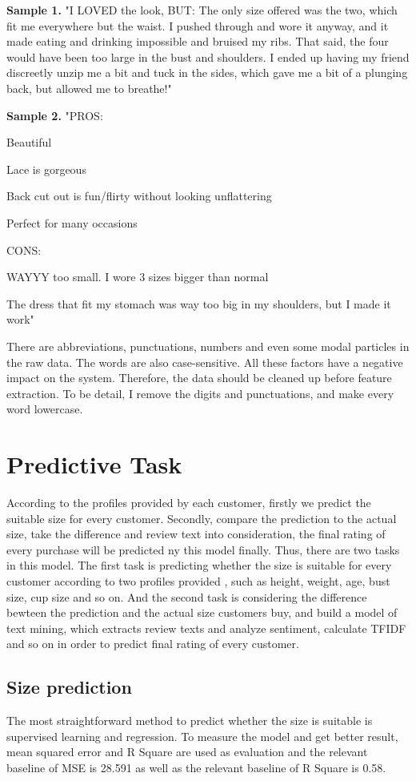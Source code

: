\documentclass[letterpaper, 10 pt, conference]{ieeeconf}  %
\begin{document}
\textbf{Sample 1.} "I LOVED the look, BUT: The only size offered was the two, which fit me everywhere but the waist. I pushed through and wore it anyway, and it made eating and drinking impossible and bruised my ribs. That said, the four would have been too large in the bust and shoulders. I ended up having my friend discreetly unzip me a bit and tuck in the sides, which gave me a bit of a plunging back, but allowed me to breathe!"

\textbf{Sample 2.} "PROS: 

Beautiful

Lace is gorgeous

Back cut out is fun/flirty without looking unflattering

Perfect for many occasions


CONS: 

WAYYY too small. I wore 3 sizes bigger than normal

The dress that fit my stomach was way too big in my shoulders, but I made it work"



There are abbreviations, punctuations, numbers and even some modal particles in the raw data. The words are also case-sensitive. All these factors have a negative impact on the system. Therefore, the data should be cleaned up before feature extraction. To be detail, I remove the digits and punctuations, and make every word lowercase.



\section{Predictive Task}
According to the profiles provided by each customer, firstly we predict the suitable size for every customer. Secondly, compare the prediction to the actual size, take the difference and review text into consideration, the final rating of every purchase will be predicted ny this model finally.
Thus, there are two tasks in this model. The first task is predicting whether the size is suitable for every customer according to two profiles provided , such as height, weight, age, bust size, cup size and so on. And the second task is considering the difference bewteen the prediction and the actual size customers buy,
and build a model of text mining, which extracts review texts and analyze sentiment, calculate TFIDF and so on in order to predict final rating of every customer.

\subsection{Size prediction}
The most straightforward method to predict whether the size is suitable is supervised learning and regression. To measure the model and get better result, mean squared error and R Square are used as evaluation and the relevant baseline of MSE is 28.591 as well as the relevant baseline of R Square is 0.58. 
\end{document}
